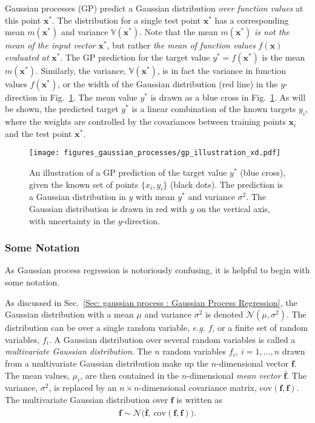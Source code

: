 \documentclass[twoside,english]{uiofysmaster}
\begin{document}
Gaussian processes (GP) predict a Gaussian distribution \textit{over function values} at this point $\textbf{x}^*$. The distribution for a single test point $\textbf{x}^*$ has a corresponding mean $m(\textbf{x}^*)$ and variance $\mathbb{V}(\textbf{x}^*)$. Note that the mean $m(\textbf{x}^*)$ \textit{is not the mean of the input vector} $\textbf{x}^*$, but rather \textit{the mean of function values} $f(\textbf{x})$ \textit{evaluated at} $\textbf{x}^*$. The GP prediction for the target value $y^*=f(\textbf{x}^*)$ is the mean $m(\textbf{x}^*)$. Similarly, the variance, $\mathbb{V}(\textbf{x}^*)$, is in fact the variance in function values $f(\textbf{x}^*)$, or the width of the Gaussian distribution (red line) in the $y$-direction in Fig.~\ref{Fig:: gaussian process : GP illustration}. The mean value $y^*$ is drawn as a blue cross in Fig.~\ref{Fig:: gaussian process : GP illustration}. As will be shown, the predicted target $y^*$ is a linear combination of the known targets $y_i$, where the weights are controlled by the covariances between training points $\textbf{x}_i$ and the test point $\textbf{x}^*$.  


\begin{figure}
\centering
\texttt{[image: figures\_gaussian\_processes/gp\_illustration\_xd.pdf]}
\caption{An illustration of a GP prediction of the target value $y^*$ (blue cross), given the known set of points $\{x_i, y_i\}$ (black dots). The prediction is a Gaussian distribution in $y$ with mean $y^*$ and variance $\sigma^2$. The Gaussian distribution is drawn in red with $y$ on the vertical axis, with uncertainty in the $y$-direction.}
\label{Fig:: gaussian process : GP illustration}
\end{figure}

\subsubsection{Some Notation}

As Gaussian process regression is notoriously confusing, it is helpful to begin with some notation. 

As discussed in Sec.~\ref{Sec: gaussian process : Gaussian Process Regression}, the Gaussian distribution with a mean $\mu$ and variance $\sigma^2$ is denoted $\mathcal{N}(\mu, \sigma^2)$. The distribution can be over a single random variable, \textit{e.g.} $f$, or a finite set of random variables, $f_i$. A Gaussian distribution over several random variables is called a \textit{multivariate Gaussian distribution}. The $n$ random variables $f_i, ~i=1,...,n$ drawn from a multivariate Gaussian distribution make up the $n$-dimensional vector $\textbf{f}$. The mean values, $\mu_i$, are then contained in the $n$-dimensional \textit{mean vector} $\bar{\textbf{f}}$. The variance, $\sigma^2$, is replaced by an $n \times n$-dimensional covariance matrix, $\text{cov}(\textbf{f}, \textbf{f})$. The multivariate Gaussian distribution over $\textbf{f}$ is written as
\begin{align}
\textbf{f} \sim \mathcal{N} \big(\bar{\textbf{f}}, ~\text{cov}(\textbf{f},\textbf{f})  \big).
\end{align}  
\end{document}
